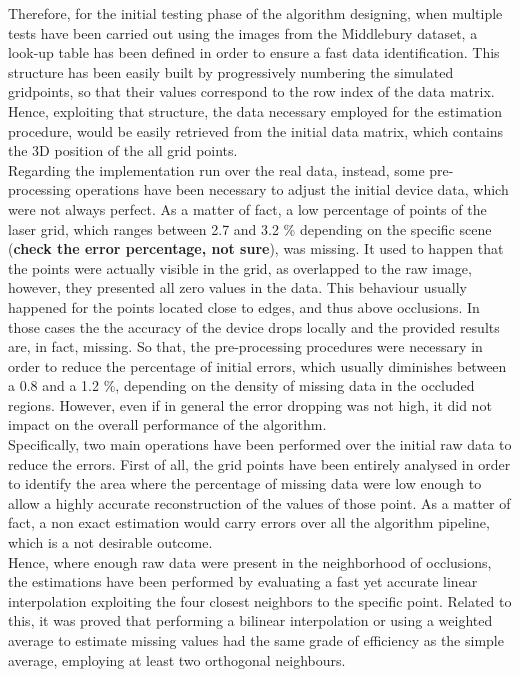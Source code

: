 Therefore, for the initial testing phase of the algorithm designing, when multiple tests have been carried out using the images from the Middlebury dataset, a look-up table has been defined in order to ensure a fast data identification. 
This structure has been easily built by progressively numbering the simulated gridpoints, so that their values correspond to the row index of the data matrix. 
Hence, exploiting that structure, the data necessary employed for the estimation procedure, would be easily retrieved from the initial data matrix, which contains the 3D position of the all grid points. \\
Regarding the implementation run over the real data, instead, some pre-processing operations have been necessary to adjust the initial device data, which were not always perfect. 
As a matter of fact, a low percentage of points of the laser grid, which ranges between 2.7 and 3.2 \% depending on the specific scene (\textbf{check the error percentage, not sure}), was missing. 
It used to happen that the points were actually visible in the grid, as overlapped to the raw image, however, they presented all zero values in the data. 
This behaviour usually happened for the points located close to edges, and thus above occlusions. 
In those cases the the accuracy of the device drops locally and the provided results are, in fact, missing. 
So that, the pre-processing procedures were necessary in order to reduce the percentage of initial errors, which usually diminishes between a 0.8 and a 1.2 \%, depending on the density of missing data in the occluded regions.
However, even if in general the error dropping was not high, it did not impact on the overall performance of the algorithm. \\
Specifically, two main operations have been performed over the initial raw data to reduce the errors.
First of all, the grid points have been entirely analysed in order to identify the area where the percentage of missing data were low enough to allow a highly accurate reconstruction of the values of those point.
As a matter of fact, a non exact estimation would carry errors over all the algorithm pipeline, which is a not desirable outcome. \\
Hence, where enough raw data were present in the neighborhood of occlusions, the estimations have been performed by evaluating a fast yet accurate linear interpolation exploiting the four closest neighbors to the specific point. 
Related to this, it was proved that performing a bilinear interpolation or using a weighted average to estimate missing values had the same grade of efficiency as the simple average, employing at least two orthogonal neighbours. \\
